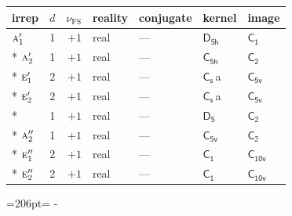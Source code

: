 \documentclass[10pt,a4paper]{article}
\newcommand{\needspace}[1]{\par\penalty-100\begingroup\dimen0=#1\relax\dimen2=\pagegoal
  \advance\dimen2-\pagetotal\ifdim\dimen0>\dimen2\relax\ifdim\dimen2>0pt\vfil\break\fi\fi
  \endgroup}
\numberwithin{equation}{section}
\newcommand{\grp}[1]{\mathsf{#1}}
\newcommand{\irr}[1]{\text{\normalfont\scshape #1}}
\newcommand{\detbox}[1]{{\setlength{\fboxsep}{1pt}\fbox{#1}}}
\newcommand{\clsletter}[1]{\,{\scriptsize\color{black!55}#1}}
\newcommand{\fsind}{\nu_{\mathrm{FS}}}
\begin{document}
{\small\renewcommand{\arraystretch}{1.25}\begin{longtable}{@{}lrrllll@{}}\toprule
irrep & $d$ & $\fsind$ & reality & conjugate & kernel & image\\\midrule\endhead
\bottomrule\endfoot\endlastfoot
$\irr{a}_{1}'$ & 1 & $+1$ & real & --- & \href{D5h.pdf}{$\grp{D_{5h}}$} & \href{C1.pdf}{$\grp{C_{1}}$}\\*
$\irr{a}_{2}'$ & 1 & $+1$ & real & --- & \href{C5h.pdf}{$\grp{C_{5h}}$} & \href{C2.pdf}{$\grp{C_{2}}$}\\*
$\irr{e}_{1}'$ & 2 & $+1$ & real & --- & \href{C1v.pdf}{$\grp{C_{s}}$}\clsletter{a} & \href{C5v.pdf}{$\grp{C_{5v}}$}\\*
$\irr{e}_{2}'$ & 2 & $+1$ & real & --- & \href{C1v.pdf}{$\grp{C_{s}}$}\clsletter{a} & \href{C5v.pdf}{$\grp{C_{5v}}$}\\*
\detbox{$\irr{a}_{1}''$} & 1 & $+1$ & real & --- & \href{D5.pdf}{$\grp{D_{5}}$} & \href{C2.pdf}{$\grp{C_{2}}$}\\*
$\irr{a}_{2}''$ & 1 & $+1$ & real & --- & \href{C5v.pdf}{$\grp{C_{5v}}$} & \href{C2.pdf}{$\grp{C_{2}}$}\\*
$\irr{e}_{1}''$ & 2 & $+1$ & real & --- & \href{C1.pdf}{$\grp{C_{1}}$} & \href{C10v.pdf}{$\grp{C_{10v}}$}\\*
$\irr{e}_{2}''$ & 2 & $+1$ & real & --- & \href{C1.pdf}{$\grp{C_{1}}$} & \href{C10v.pdf}{$\grp{C_{10v}}$}\\
\bottomrule\end{longtable}}
\needspace{206pt}
\end{document}
